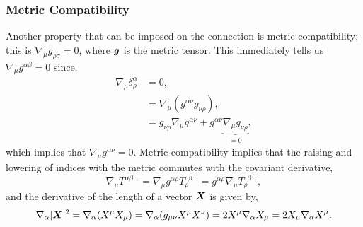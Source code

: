 \subsubsection{Metric Compatibility}
Another property that can be imposed on the connection is metric compatibility; this is $\nabla_\mu g_{\rho\sigma}=0$, where $\boldsymbol{g}$ is the metric tensor. This immediately tells us $\nabla_\mu g^{\alpha\beta}=0$ since,
\begin{align}
\nabla_\mu \delta^\alpha_\rho &= 0, \\
&=  \nabla_\mu(g^{\alpha \nu}g_{\nu \rho}) ,\\
&= g_{\nu \rho}\nabla_\mu g^{\alpha \nu} + g^{\alpha \nu}\underbrace{\nabla_\mu g_{\nu \rho}}_{=0},
\end{align}
which implies that $\nabla_\mu g^{\alpha\nu}=0$. Metric compatibility implies that the raising and lowering of indices with the metric commutes with the covariant derivative,
\begin{equation} \nabla_{\mu} T^{\alpha \beta ...} = \nabla_\mu g^{\alpha\rho}T_{\rho}^{\,\,\,\beta ...} = g^{\alpha\rho} \nabla_\mu T_{\rho}^{\,\,\,\beta ...}, \end{equation}
and the derivative of the length of a vector $\boldsymbol{X}$ is given by,
\begin{equation}
\nabla_\alpha |\boldsymbol{X}|^2=\nabla_\alpha (X^\mu X_\mu) = \nabla_\alpha (g_{\mu\nu}X^\mu X^\nu) = 2 X^\mu \nabla_\alpha X_\mu = 2 X_\mu \nabla_\alpha X^\mu.
\end{equation}


